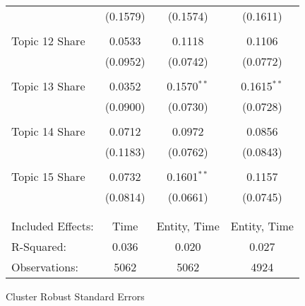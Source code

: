 \begin{center}
\begin{tabular}{lccc}
 & (0.1579)& (0.1574)& (0.1611)\\ 
\\Topic 12 Share & 0.0533 & 0.1118 & 0.1106 \\
 & (0.0952)& (0.0742)& (0.0772)\\ 
\\Topic 13 Share & 0.0352 & 0.1570$^{**}$ & 0.1615$^{**}$ \\
 & (0.0900)& (0.0730)& (0.0728)\\ 
\\Topic 14 Share & 0.0712 & 0.0972 & 0.0856 \\
 & (0.1183)& (0.0762)& (0.0843)\\ 
\\Topic 15 Share & 0.0732 & 0.1601$^{**}$ & 0.1157 \\
 & (0.0814)& (0.0661)& (0.0745)\\ 
\hline \\[-1.8ex]
 \\ Included Effects:  & Time & Entity, Time & Entity, Time\\ R-Squared:  & 0.036&0.020&0.027\\ Observations:  & 5062&5062&4924\end{tabular}
\end{center}Cluster Robust Standard Errors